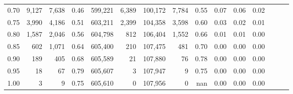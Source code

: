 \begin{tabular}{rrrrrrrrrrrrrrr}
0.70 &    9,127 &   7,638 &  0.46 &  599,221 &    6,389 &  100,172 &    7,784 &  0.55 &  0.07 &  0.06 &      0.02 \\
0.75 &    3,990 &   4,186 &  0.51 &  603,211 &    2,399 &  104,358 &    3,598 &  0.60 &  0.03 &  0.02 &      0.01 \\
0.80 &    1,587 &   2,046 &  0.56 &  604,798 &      812 &  106,404 &    1,552 &  0.66 &  0.01 &  0.01 &      0.00 \\
0.85 &      602 &   1,071 &  0.64 &  605,400 &      210 &  107,475 &      481 &  0.70 &  0.00 &  0.00 &      0.00 \\
0.90 &      189 &     405 &  0.68 &  605,589 &       21 &  107,880 &       76 &  0.78 &  0.00 &  0.00 &      0.00 \\
0.95 &       18 &      67 &  0.79 &  605,607 &        3 &  107,947 &        9 &  0.75 &  0.00 &  0.00 &      0.00 \\
1.00 &        3 &       9 &  0.75 &  605,610 &        0 &  107,956 &        0 &   nan &  0.00 &  0.00 &      0.00 \\
\bottomrule
\end{tabular}
